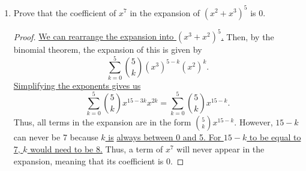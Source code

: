 \documentclass{article}
\begin{document}
\begin{enumerate}
\begin{proof}
\begin{align}
        \end{align} which is equal to the right-hand side. 
    \end{proof} 
    \colorbox{CornflowerBlue}{
    \begin{minipage}[c]{0.9\textwidth}
        \centering
        For item \#16, we're asked to explain the steps of a given proof, so I'll just illustrate the entire proof here and highlight the added parts.
    \end{minipage}%
    }%
    \item Prove that the coefficient of $x^7$ in the expansion of ${(x^2 + x^3)}^5$ is 0.\begin{proof} 
        \underline{We can rearrange the expansion into ${(x^3 + x^2)}^5$.} Then, by the binomial theorem, the expansion of this is given by\[
            \sum_{k=0}^5 \binom{5}{k} {(x^3)}^{5-k} {(x^2)}^{k}.    
        \] \underline{Simplifying the exponents gives us}\[
            \sum_{k=0}^5 \binom{5}{k} x^{15-3k} x^{2k} = \sum_{k=0}^5 \binom{5}{k} x^{15-k}. 
        \] Thus, all terms in the expansion are in the form $\binom{5}{k} x^{15-k} $. However, $15-k$ can never be 7 because \underline{$k$ is} 
        \underline{always between 0 and 5. For 
        $15-k$ to be equal to 7, $k$ would need to be 8.} Thus, a term of $x^7$ will never appear in the expansion, meaning that its coefficient is 0.  
    \end{proof} 
\end{enumerate} 

\pagebreak
\end{document}
